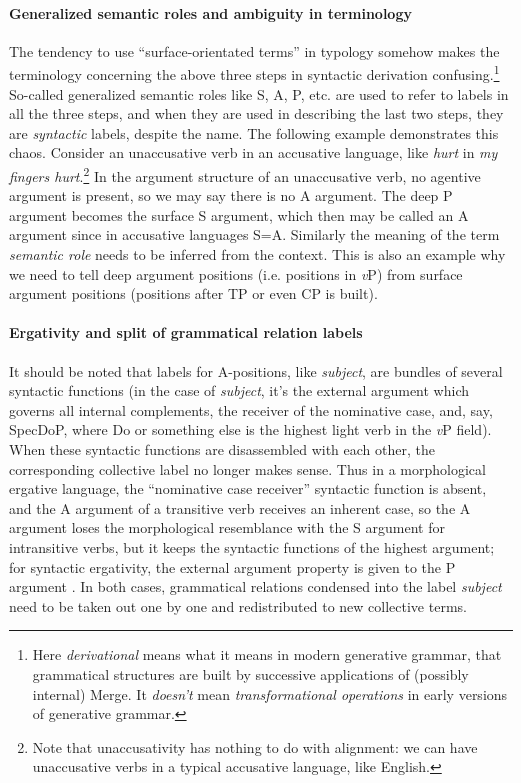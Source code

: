 \documentclass[a4paper, oneside, 12pt]{report}
\newcommand*{\term}[1]{\emph{#1}}
\newcommand{\form}[1]{\emph{#1}}
\newcommand{\vP}{\textit{v}P}
\begin{document}
{\paragraph{Generalized semantic roles and ambiguity in terminology} 
The tendency to use ``surface-orientated terms'' in typology 
somehow makes the terminology concerning the 
above three steps in syntactic derivation confusing.\footnote{
    Here \term{derivational} means what it means in modern generative grammar, 
    that grammatical structures are built by successive applications of (possibly internal) Merge.
    It \emph{doesn't} mean \emph{transformational operations}
    in early versions of generative grammar.
}
So-called generalized semantic roles like S, A, P, etc.
are used to refer to labels in all the three steps, 
and when they are used in describing the last two steps,
they are \emph{syntactic} labels, despite the name. 
The following example demonstrates this chaos.
Consider an unaccusative verb in an accusative language,
like \form{hurt} in \form{my fingers hurt}.\footnote{
    Note that unaccusativity has nothing to do with alignment:
    we can have unaccusative verbs in a typical accusative language, like English.
} 
In the argument structure of an unaccusative verb,
no agentive argument is present,
so we may say there is no A argument. 
The deep P argument becomes the surface S argument,
which then may be called an A argument since in accusative languages S=A.
Similarly the meaning of the term \term{semantic role}
needs to be inferred from the context.
This is also an example why we need to tell deep argument positions (i.e. positions in \vP{})
from surface argument positions (positions after TP or even CP is built).

\paragraph{Ergativity and split of grammatical relation labels}
It should be noted that labels for A-positions, like \term{subject},
are bundles of several syntactic functions
(in the case of \term{subject}, 
it's the external argument which governs all internal complements, 
the receiver of the nominative case, and, say, SpecDoP, 
where Do or something else is the highest light verb in the \vP{} field).
When these syntactic functions are disassembled with each other, 
the corresponding collective label no longer makes sense.
Thus in a morphological ergative language, 
the ``nominative case receiver'' syntactic function is absent, 
and the A argument of a transitive verb receives an inherent case, 
so the A argument loses the morphological resemblance with the 
S argument for intransitive verbs, 
but it keeps the syntactic functions of 
the highest argument; 
for syntactic ergativity, 
the external argument property is given to the P argument \citep{aldridge2008generative}.
In both cases, grammatical relations condensed into the label \term{subject} 
need to be taken out one by one and redistributed to new collective terms.

}
\end{document}
